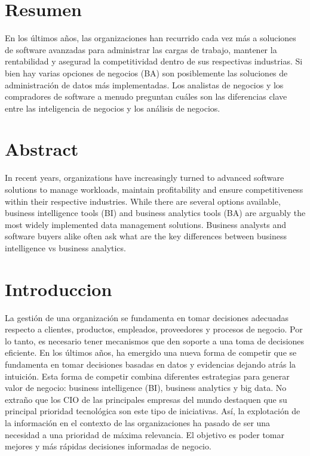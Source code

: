 \documentclass[twoside,twocolumn]{article}
\begin{document}
\section{Resumen}
En los últimos años, las organizaciones han recurrido cada vez más a soluciones de 
software avanzadas para administrar las cargas de trabajo, mantener la rentabilidad y
asegurad la competitividad dentro de sus respectivas industrias. Si bien hay varias opciones de negocios
(BA) son posiblemente las soluciones de administración de datos más implementadas. Los analistas de negocios y los 
compradores de software a menudo preguntan cuáles son las diferencias clave entre las inteligencia de negocios y los
análisis de negocios.


\section{Abstract}
In recent years, organizations have increasingly turned to advanced software solutions to 
manage workloads, maintain profitability and ensure competitiveness within their respective
 industries. While there are several options 
 available, business intelligence tools (BI) and business analytics tools (BA) are 
 arguably the most widely implemented data management solutions. Business analysts
  and software buyers alike often ask what are the key differences between business intelligence vs business analytics.






\section{Introduccion}

La gestión de una organización se fundamenta en tomar decisiones adecuadas respecto a 
clientes, productos, empleados, proveedores y procesos de negocio. Por lo tanto, es necesario 
tener mecanismos que den soporte a una toma de decisiones eficiente. En los últimos años, ha 
emergido una nueva forma de competir que se fundamenta en tomar decisiones basadas en 
datos y evidencias dejando atrás la intuición. Esta forma de competir combina diferentes 
estrategias para generar valor de negocio: business intelligence (BI), business analytics y big 
data. No extraño que los CIO de las principales empresas del mundo destaquen que su principal 
prioridad tecnológica son este tipo de iniciativas. Así, la explotación de la información en el 
contexto de las organizaciones ha pasado de ser una necesidad a una prioridad de máxima 
relevancia. El objetivo es poder tomar mejores y más rápidas decisiones informadas de negocio.
\begin{center}

\end{center}
\end{document}
